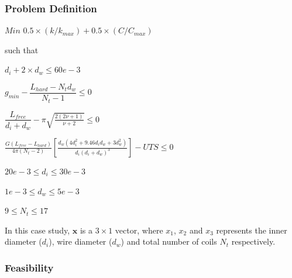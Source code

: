 \documentclass[10pt]{article}
\begin{document}
	

	\subsubsection{Problem Definition}
	
	\centerline{$Min$ \hspace{2 mm}$0.5 \times(k/k_{max}) + 0.5 \times (C/C_{max})$}
	\begin{center}such that \end{center}
	\centerline{$d_{i} + 2 \times d_{w} \leq 60e-3$}
	\centerline{$g_{min} - \dfrac{L_{hard} - N_{t}d_{w}}{N_{t}-1} \leq 0$}
	\centerline{$\dfrac{L_{free}}{d_{i} + d_{w}} - \pi \sqrt{\frac{2(2 \nu + 1)}{\nu + 2}} \leq 0$}
	\centerline{$\frac{G(L_{free} - L_{hard})}{4 \pi (N_{t} - 2) } \left[\frac{d_{w} (4d_{i}^{2} + 9.46d_{i} 
d_{w} + 3 d_{w}^{2})}{d_{i}(d_{i}+d_{w})^{3}}\right] - UTS \leq 0$}
    \centerline{$20e-3 \leq d_{i} \leq 30e-3$}
    \centerline{$1e-3 \leq d_{w} \leq 5e-3$}
    \centerline{$9 \leq N_{t} \leq 17$}
    
\begin{flushleft}
In this case study, $\textbf{x}$ is a $3 \times 1$ vector, where $x_{1}$, $x_{2}$ and $x_{3}$ represents the inner diameter ($d_{i}$), wire diameter ($d_{w}$) and total number of coils $N_{t}$ respectively.

\end{flushleft}
    
\newpage
	
	\subsubsection{Feasibility}
	
\end{document}
